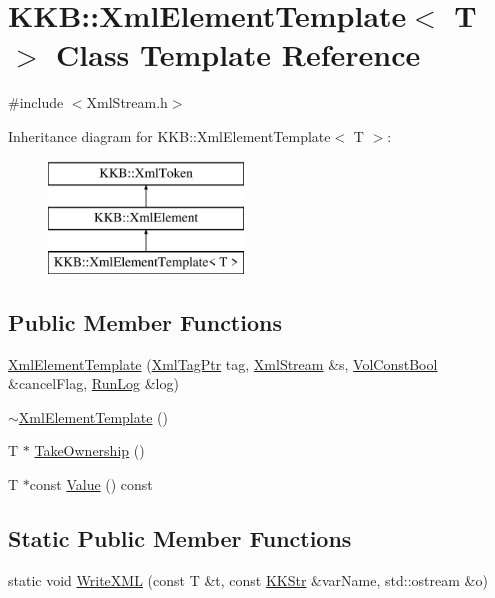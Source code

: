 \hypertarget{class_k_k_b_1_1_xml_element_template}{}\section{K\+KB\+:\+:Xml\+Element\+Template$<$ T $>$ Class Template Reference}
\label{class_k_k_b_1_1_xml_element_template}


{\ttfamily \#include $<$Xml\+Stream.\+h$>$}

Inheritance diagram for K\+KB\+:\+:Xml\+Element\+Template$<$ T $>$\+:\begin{figure}[H]
\begin{center}
\leavevmode
\includegraphics[height=3.000000cm]{class_k_k_b_1_1_xml_element_template}
\end{center}
\end{figure}
\subsection*{Public Member Functions}
\begin{DoxyCompactItemize}
\item 
\hyperlink{class_k_k_b_1_1_xml_element_template_a448ad8e64280f2fde3c6b5a1f52ab989}{Xml\+Element\+Template} (\hyperlink{namespace_k_k_b_a9253a3ea8a5da18ca82be4ca2b390ef0}{Xml\+Tag\+Ptr} tag, \hyperlink{class_k_k_b_1_1_xml_stream}{Xml\+Stream} \&s, \hyperlink{namespace_k_k_b_a7d390f568e2831fb76b86b56c87bf92f}{Vol\+Const\+Bool} \&cancel\+Flag, \hyperlink{class_k_k_b_1_1_run_log}{Run\+Log} \&log)
\item 
\hyperlink{class_k_k_b_1_1_xml_element_template_aca64261ea2614c0894e24476879a1c06}{$\sim$\+Xml\+Element\+Template} ()
\item 
T $\ast$ \hyperlink{class_k_k_b_1_1_xml_element_template_a1fd0ce7b0d0ee0d57fb29ca09d3ad6fc}{Take\+Ownership} ()
\item 
T $\ast$const \hyperlink{class_k_k_b_1_1_xml_element_template_a3d671b57251b4b256fecb2197fc4a0f4}{Value} () const 
\end{DoxyCompactItemize}
\subsection*{Static Public Member Functions}
\begin{DoxyCompactItemize}
\item 
static void \hyperlink{class_k_k_b_1_1_xml_element_template_aa32ee34673b14ffadd1d80c2960292b1}{Write\+X\+ML} (const T \&t, const \hyperlink{class_k_k_b_1_1_k_k_str}{K\+K\+Str} \&var\+Name, std\+::ostream \&o)
\end{DoxyCompactItemize}
